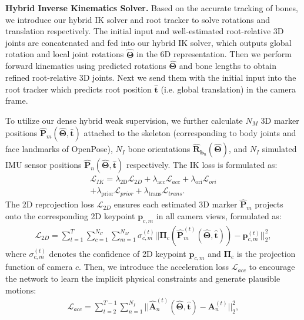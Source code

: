 \documentclass[letterpaper]{article} \usepackage{aaai23}  \usepackage{times}  \usepackage{helvet}  \usepackage{courier}  \usepackage[hyphens]{url}  \usepackage{graphicx} \urlstyle{rm} \def\UrlFont{\rm}  \usepackage{natbib}  \usepackage{caption} \frenchspacing  \setlength{\pdfpagewidth}{8.5in}  \setlength{\pdfpageheight}{11in}  \usepackage{algorithm}
\newcommand{\myparagraph}[1]{\vspace{0.1em}\noindent\textbf{#1}}
\begin{document}
\myparagraph{Hybrid Inverse Kinematics Solver.}
Based on the accurate tracking of bones, we introduce our hybrid IK solver and root tracker to solve rotations and translation respectively. The initial input and well-estimated root-relative 3D joints are concatenated and fed into our hybrid IK solver, which outputs global rotation and local joint rotations $\mathbf{\hat{\Theta}}$ in the 6D representation. Then we perform forward kinematics using predicted rotations $\mathbf{\hat{\Theta}}$ and bone lengths to obtain refined root-relative 3D joints. Next we send them with the initial input into the root tracker which predicts root position $\hat{\textbf{t}}$ (i.e. global translation) in the camera frame. 

To utilize our dense hybrid weak supervision, we
further
calculate $N_M$ 3D marker positions $\mathbf{\hat{P}}_m(\mathbf{\hat{\Theta}}, \hat{\textbf{t}})$ attached to the skeleton (corresponding to body joints and face landmarks of OpenPose), $N_I$ bone orientations $\mathbf{\hat{R}}_{\textbf{b}_n}(\mathbf{\hat{\Theta}})$, 
and $N_I$ simulated IMU sensor positions $\mathbf{\hat{P}}_n(\mathbf{\hat{\Theta}}, \hat{\textbf{t}})$ 
respectively. The IK loss
is formulated as:
\begin{align}
	\mathcal{L}_{IK} = \lambda_{\mathrm{2D}}\mathcal{L}_{2D} + \lambda_{\mathrm{acc}}\mathcal{L}_{acc}+ \lambda_{\mathrm{ori}}\mathcal{L}_{ori} \nonumber\\
	+ \lambda_{\mathrm{prior}}\mathcal{L}_{prior} + \lambda_{\mathrm{trans}}\mathcal{L}_{trans}.
\end{align}
The 2D reprojection loss $\mathcal{L}_{2D}$ ensures each estimated 3D marker $\mathbf{\hat{P}}_{m}$ projects onto the corresponding 2D keypoint $\mathbf{p}_{c,m}$ in all camera views, formulated as:
\begin{align}
	\mathcal{L}_{2D} = \sum_{t=1}^T \sum_{c=1}^{N_C} \sum_{m=1}^{N_M} \sigma_{c,m}^{(t)}||\mathbf{\Pi}_c(\mathbf{\hat{P}}_{m}^{(t)}(\mathbf{\hat{\Theta}}, \hat{\textbf{t}}))  - \mathbf{p}_{c,m}^{(t)}||_2^2,
\end{align}
where $\sigma_{c,m}^{(t)}$ denotes the confidence of 2D keypoint $\mathbf{p}_{c,m}$ and $\mathbf{\Pi}_c$ is the projection function of camera $c$.
Then, we introduce the acceleration loss $\mathcal{L}_{acc}$ to encourage the network to learn the implicit physical constraints and generate plausible motions:
\begin{align}
	\mathcal{L}_{acc} = \sum_{t=2}^{T-1} \sum_{n=1}^{N_I} ||\mathbf{\hat{A}}_n^{(t)}(\mathbf{\hat{\Theta}}, \hat{\textbf{t}})  - \mathbf{A}_n^{(t)}||_2^2,
\end{align}
\end{document}
